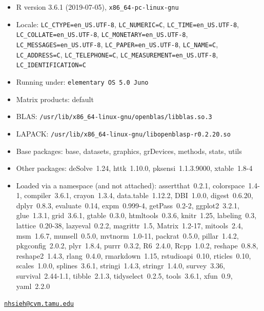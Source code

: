 \begin{itemize}\raggedright
  \item R version 3.6.1 (2019-07-05), \verb|x86_64-pc-linux-gnu|
  \item Locale: \verb|LC_CTYPE=en_US.UTF-8|, \verb|LC_NUMERIC=C|, \verb|LC_TIME=en_US.UTF-8|, \verb|LC_COLLATE=en_US.UTF-8|, \verb|LC_MONETARY=en_US.UTF-8|, \verb|LC_MESSAGES=en_US.UTF-8|, \verb|LC_PAPER=en_US.UTF-8|, \verb|LC_NAME=C|, \verb|LC_ADDRESS=C|, \verb|LC_TELEPHONE=C|, \verb|LC_MEASUREMENT=en_US.UTF-8|, \verb|LC_IDENTIFICATION=C|
  \item Running under: \verb|elementary OS 5.0 Juno|
  \item Matrix products: default
  \item BLAS:   \verb|/usr/lib/x86_64-linux-gnu/openblas/libblas.so.3|
  \item LAPACK: \verb|/usr/lib/x86_64-linux-gnu/libopenblasp-r0.2.20.so|
  \item Base packages: base, datasets, graphics, grDevices,
    methods, stats, utils
  \item Other packages: deSolve~1.24, httk~1.10.0,
    pksensi~1.1.3.9000, xtable~1.8-4
  \item Loaded via a namespace (and not attached):
    assertthat~0.2.1, colorspace~1.4-1, compiler~3.6.1,
    crayon~1.3.4, data.table~1.12.2, DBI~1.0.0, digest~0.6.20,
    dplyr~0.8.3, evaluate~0.14, expm~0.999-4, getPass~0.2-2,
    ggplot2~3.2.1, glue~1.3.1, grid~3.6.1, gtable~0.3.0,
    htmltools~0.3.6, knitr~1.25, labeling~0.3, lattice~0.20-38,
    lazyeval~0.2.2, magrittr~1.5, Matrix~1.2-17, mitools~2.4,
    msm~1.6.7, munsell~0.5.0, mvtnorm~1.0-11, packrat~0.5.0,
    pillar~1.4.2, pkgconfig~2.0.2, plyr~1.8.4, purrr~0.3.2,
    R6~2.4.0, Rcpp~1.0.2, reshape~0.8.8, reshape2~1.4.3,
    rlang~0.4.0, rmarkdown~1.15, rstudioapi~0.10, rticles~0.10,
    scales~1.0.0, splines~3.6.1, stringi~1.4.3, stringr~1.4.0,
    survey~3.36, survival~2.44-1.1, tibble~2.1.3,
    tidyselect~0.2.5, tools~3.6.1, xfun~0.9, yaml~2.2.0
\end{itemize}




\address{%
Nan-Hung Hsieh\\
Veterinary Integrative Biosciences, College of Veterinary Medicine and
Biomedical Sciences, Texas A\&M University\\
College Station, TX, USA\\
}
\href{mailto:nhsieh@cvm.tamu.edu}{\nolinkurl{nhsieh@cvm.tamu.edu}}

